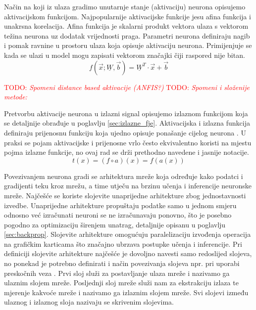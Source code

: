 \documentclass[times, utf8, diplomski]{fer}
\def\mat#1{\underline{#1}}
\def\TODO#1{\noindent\textcolor{red}{TODO: \textit{#1}}\newline}
\def\todo#1{\TODO{#1}}
\begin{document}
Način na koji iz ulaza gradimo unutarnje stanje (aktivaciju) neurona opisujemo aktivacijskom funkcijom. Najpopularnije aktivacijske funkcije jesu afina funkcija i unakrsna korelacija.
Afina funkcija je skalarni produkt vektora ulaza s vektorom težina neurona uz dodatak vrijednosti praga. Parametri neurona definiraju nagib i pomak ravnine u prostoru ulaza koja opisuje aktivaciju neurona. Primijenjuje se kada se ulazi u model mogu zapisati vektorom značajki čiji raspored nije bitan.
\begin{equation}
f(\vec{x};\mat{W},\vec{b})=\mat{W}^T \cdot \vec{x} + \vec{b}
\end{equation}

\todo{Spomeni distance based aktivacije (ANFIS?)}
\todo{Spomeni i složenije metode: \citep{network_in_network}}

Pretvorbu aktivacije neurona u izlazni signal opisujemo izlaznom funkcijom koja se detaljnije obrađuje u poglavlju \ref{sec:izlazne_fje}. Aktivacijska i izlazna funkcija definiraju prijenosnu funkciju koja ujedno opisuje ponašanje cijelog neurona \citep{function_survey}. U praksi se pojam aktivacijske i prijenosne vrlo često ekvivalentno koristi na mjestu pojma izlazne funkcije, no ovaj rad se drži prethodno navedene i jasnije notacije.
\begin{equation}
t(x) = (f \circ a)(x) = f(a(x))
\end{equation}

Povezivanjem neurona gradi se arhitektura mreže koja određuje kako podatci i gradijenti teku kroz mrežu, a time utječu na brzinu učenja i inferencije neuronske mreže. Najčešće se koriste slojevite unaprijedne arhitekture zbog jednostavnosti izvedbe. Unaprijedne arhitekture propuštaju podatke samo u jednom smjeru odnosno već izračunati neuroni se ne izračunavaju ponovno, što je posebno pogodno za optimizaciju širenjem unatrag, detaljnije opisanu u poglavlju \ref{sec:backprop}. Slojevite arhitekture omogućuju paralelizaciju izvođenja operacija na grafičkim karticama što značajno ubrzava postupke učenja i inferencije. Pri definiciji slojevite arhitekture najčešće je dovoljno navesti samo redoslijed slojeva, no ponekad je potrebno definirati i način povezivanja slojeva npr. pri uporabi preskočnih veza \citep{highwaynet, resnet, densenet}. Prvi sloj služi za postavljanje ulaza mreže i nazivamo ga ulaznim slojem mreže. Posljednji sloj mreže služi nam za ekstrakciju izlaza te mjerenje kakvoće mreže i nazivamo ga izlaznim slojem mreže. Svi slojevi između ulaznog i izlaznog sloja nazivaju se skrivenim slojevima.
\end{document}
